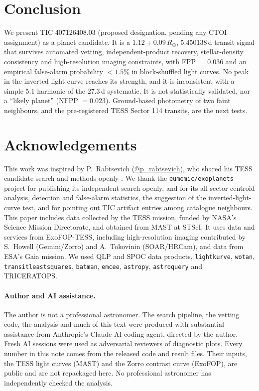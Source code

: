 \documentclass[11pt]{article}
\begin{document}
\section{Conclusion}
We present TIC 407126408.03 (proposed designation, pending any CTOI assignment) as a planet candidate. It is a $1.12\pm0.09\,R_\oplus$, 5.450138\,d transit signal that survives automated vetting, independent-product recovery, stellar-density consistency and high-resolution imaging constraints, with FPP $=0.036$ and an empirical false-alarm probability $<1.5\%$ in block-shuffled light curves. No peak in the inverted light curve reaches its strength, and it is inconsistent with a simple 5:1 harmonic of the 27.3\,d systematic. It is not statistically validated, nor a ``likely planet'' (NFPP $=0.023$). Ground-based photometry of two faint neighbours, and the pre-registered TESS Sector 114 transits, are the next tests.

\section*{Acknowledgements}
This work was inspired by P.~Rabtsevich (\href{https://x.com/p_rabtsevich}{@p\_rabtsevich}), who shared his TESS candidate search and methods openly \cite{rabtsevich}. We thank the \texttt{eumemic/exoplanets} project for publishing its independent search openly, and for its all-sector centroid analysis, detection and false-alarm statistics, the suggestion of the inverted-light-curve test, and for pointing out TIC artifact entries among catalogue neighbours. This paper includes data collected by the TESS mission, funded by NASA's Science Mission Directorate, and obtained from MAST at STScI. It uses data and services from ExoFOP-TESS, including high-resolution imaging contributed by S.~Howell (Gemini/Zorro) and A.~Tokovinin (SOAR/HRCam), and data from ESA's Gaia mission. We used QLP and SPOC data products, \texttt{lightkurve}, \texttt{wotan}, \texttt{transitleastsquares}, \texttt{batman}, \texttt{emcee}, \texttt{astropy}, \texttt{astroquery} and \textsc{TRICERATOPS}.

\paragraph{Author and AI assistance.} The author is not a professional astronomer. The search pipeline, the vetting code, the analysis and much of this text were produced with substantial assistance from Anthropic's Claude AI coding agent, directed by the author. Fresh AI sessions were used as adversarial reviewers of diagnostic plots. Every number in this note comes from the released code and result files. Their inputs, the TESS light curves (MAST) and the Zorro contrast curve (ExoFOP), are public and are not repackaged here. No professional astronomer has independently checked the analysis.
\end{document}
